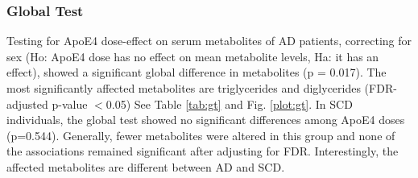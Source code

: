 \documentclass{amsart}
\begin{document}
\subsubsection{Global Test}
Testing for ApoE4 dose-effect on serum metabolites of AD patients, correcting for sex (Ho: ApoE4 dose has no effect on mean metabolite levels, Ha: it has an effect), showed a significant global difference in metabolites (p = 0.017). The most significantly affected metabolites are triglycerides and diglycerides (FDR-adjusted p-value $<$0.05) See Table \ref{tab:gt} and Fig. \ref{plot:gt}. In SCD individuals, the global test showed no significant differences among ApoE4 doses (p=0.544). Generally, fewer metabolites were altered in this group and none of the associations remained significant after adjusting for FDR. Interestingly, the affected metabolites are different between AD and SCD.
\end{document}
